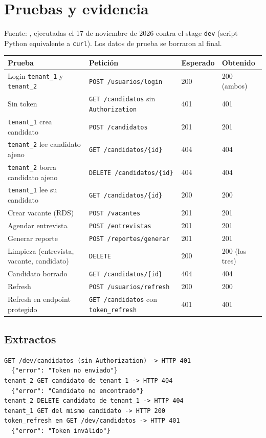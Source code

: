 \section{Pruebas y evidencia}\label{sec:pruebas}
Fuente: , ejecutadas el 17 de noviembre de 2026 contra el stage \texttt{dev} (script Python equivalente a \texttt{curl}). Los datos de prueba se borraron al final.

\begin{longtable}{p{4.4cm}p{5.4cm}p{1.6cm}p{2.4cm}}
\toprule
\textbf{Prueba} & \textbf{Petición} & \textbf{Esperado} & \textbf{Obtenido} \\
\midrule
\endhead
Login \texttt{tenant\_1} y \texttt{tenant\_2} & \texttt{POST /usuarios/login} & 200 & 200 (ambos) \\
Sin token & \texttt{GET /candidatos} sin \texttt{Authorization} & 401 & 401 \\
\texttt{tenant\_1} crea candidato & \texttt{POST /candidatos} & 201 & 201 \\
\texttt{tenant\_2} lee candidato ajeno & \texttt{GET /candidatos/\{id\}} & 404 & 404 \\
\texttt{tenant\_2} borra candidato ajeno & \texttt{DELETE /candidatos/\{id\}} & 404 & 404 \\
\texttt{tenant\_1} lee su candidato & \texttt{GET /candidatos/\{id\}} & 200 & 200 \\
Crear vacante (RDS) & \texttt{POST /vacantes} & 201 & 201 \\
Agendar entrevista & \texttt{POST /entrevistas} & 201 & 201 \\
Generar reporte & \texttt{POST /reportes/generar} & 201 & 201 \\
Limpieza (entrevista, vacante, candidato) & \texttt{DELETE} & 200 & 200 (los tres) \\
Candidato borrado & \texttt{GET /candidatos/\{id\}} & 404 & 404 \\
Refresh & \texttt{POST /usuarios/refresh} & 200 & 200 \\
Refresh en endpoint protegido & \texttt{GET /candidatos} con \texttt{token\_refresh} & 401 & 401 \\
\bottomrule
\end{longtable}

\subsection{Extractos}
\begin{lstlisting}
GET /dev/candidatos (sin Authorization) -> HTTP 401
  {"error": "Token no enviado"}
tenant_2 GET candidato de tenant_1 -> HTTP 404
  {"error": "Candidato no encontrado"}
tenant_2 DELETE candidato de tenant_1 -> HTTP 404
tenant_1 GET del mismo candidato -> HTTP 200
token_refresh en GET /dev/candidatos -> HTTP 401
  {"error": "Token inválido"}
\end{lstlisting}

